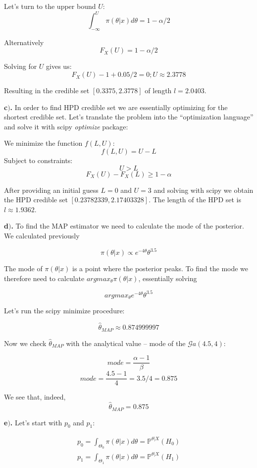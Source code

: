 \documentclass[a4 paper]{article}
\begin{document}
Let's turn to the upper bound $U$:
$$
\int_{-\infty}^{U} \pi(\theta | x) d \theta= 1 - \alpha / 2
$$

Alternatively
$$
F_{X}(U) = 1 - \alpha / 2
$$

Solving for $U$ gives us:
$$
F_{X}(U) - 1 + 0.05 / 2 = 0; U \approx 2.3778
$$

Resulting in the credible set 
$[0.3375, 2.3778]$ of length $l=2.0403$. \newline 


\textbf{c$)$.} In order to find HPD credible set 
we are essentially optimizing for the shortest 
credible set. Let's translate the problem into the
``optimization language'' and solve it 
with scipy \textit{optimize} package:

We minimize the function $f(L,U)$:
$$
f(L,U) = U-L
$$
Subject to constraints:
$$
U>L
$$
$$
F_{X}(U)-F_{X}(L)\geq1-\alpha
$$

After providing an initial guess $L=0$ and $U=3$ and
solving with scipy we obtain
the HPD credible set $[0.23782339, 2.17403328]$.
The length of the HPD set 
is $l \approx 1.9362$. \newline



\textbf{d$)$.} To find the MAP estimator we need to 
calculate the mode of the posterior.
We calculated previously 

$$
\pi(\theta|x)\propto e^{-4\theta}\theta^{3.5}
$$

The mode of $\pi(\theta|x)$ is a point 
where the posterior peaks. To find the mode
we therefore need to 
calculate $argmax_{\theta}\pi(\theta|x)$,
essentially solving

$$
argmax_{\theta}e^{-4\theta}\theta^{3.5}
$$

Let's run the scipy minimize procedure:

$$
\hat{\theta}_{MAP}\approx0.874999997
$$

Now we check $\hat{\theta}_{MAP}$
with the analytical value --
mode of the $\mathcal{G}a\left(4.5,4\right)$:

$$
mode=\frac{\alpha-1}{\beta}
$$
$$
mode=\frac{4.5-1}{4}=3.5/4 = 0.875 
$$

We see that, indeed, $$\hat{\theta}_{MAP}=0.875$$ \newline


\textbf{e$)$.} Let's start with $p_0$ and $p_1$:

$$
\begin{array}{l}
{p_{0}=\int_{\Theta_{0}} \pi(\theta | x) d \theta=\mathbb{P}^{\theta | X}\left(H_{0}\right)} \\
{p_{1}=\int_{\Theta_{1}} \pi(\theta | x) d \theta=\mathbb{P}^{\theta | X}\left(H_{1}\right)}
\end{array}
$$
\end{document}
